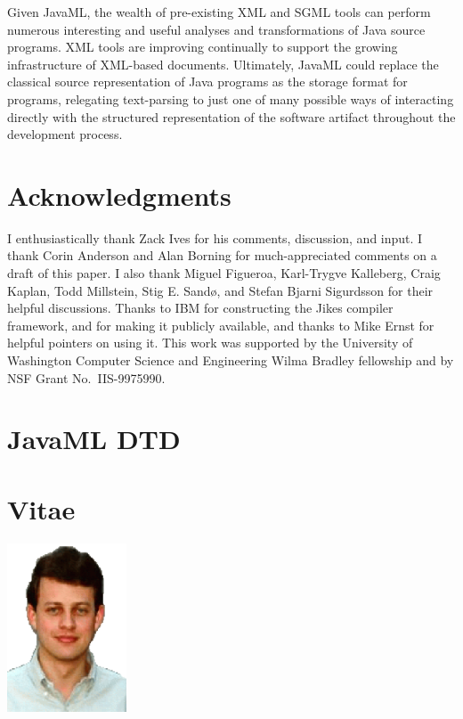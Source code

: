\documentclass{article}
\begin{document}
\begin{multicols}{2}
Given JavaML, the wealth of pre-existing XML and SGML tools can perform
numerous interesting and useful analyses and transformations of Java
source programs.  XML tools are improving continually to support the
growing infrastructure of XML-based documents.  Ultimately, JavaML could
replace the classical source representation of Java programs as the
storage format for programs, relegating text-parsing to just one of many
possible ways of interacting directly with the structured representation
of the software artifact throughout the development process.

\section*{Acknowledgments}
\label{sec-ack}

I enthusiastically thank Zack Ives for his comments, discussion, and
input.  I thank Corin Anderson and Alan Borning for much-appreciated
comments on a draft of this paper.  I also thank Miguel Figueroa,
Karl-Trygve Kalleberg, Craig Kaplan, Todd Millstein, Stig E. Sand\o, and
Stefan Bjarni Sigurdsson for their helpful discussions. Thanks to IBM
for constructing the Jikes compiler framework, and for making it
publicly available, and thanks to Mike Ernst for helpful pointers on
using it. This work was supported by the University of Washington
Computer Science and Engineering Wilma Bradley fellowship and by NSF
Grant No.~IIS-9975990.

\appendix
\section{JavaML DTD}
\label{app-javaml-dtd}

{\small

}

{\small
}


\section*{Vitae}
\begin{floatingfigure}[l]{1.2in}
\hspace*{-.8cm}
\includegraphics[width=1.4in]{gjb-face.eps}
\end{floatingfigure}


\end{multicols}
\end{document}
